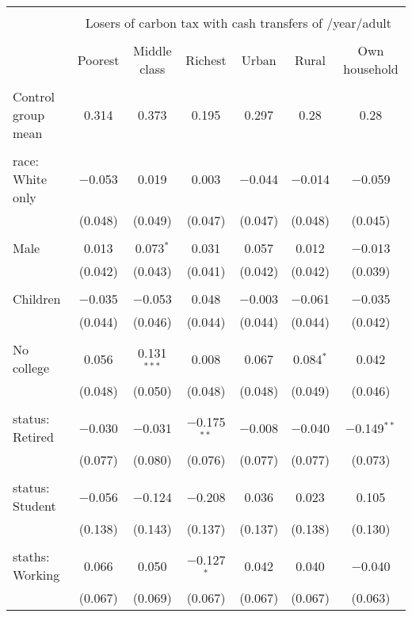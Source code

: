 
\begin{tabular}{@{\extracolsep{5pt}}lcccccc} 
\\[-1.8ex]\hline 
\hline \\[-1.8ex] 
 & \multicolumn{6}{c}{Losers of carbon tax with cash transfers of \textdollar 600/year/adult} \\ 
\cline{2-7} 
\\[-1.8ex] & Poorest & Middle class & Richest & Urban & Rural & Own household \\ 
\hline \\[-1.8ex] 
 Control group mean & 0.314 & 0.373 & 0.195 & 0.297 & 0.28 & 0.28  \\ \hline \\[-1.8ex] race: White only & $-$0.053 & 0.019 & 0.003 & $-$0.044 & $-$0.014 & $-$0.059 \\ 
  & (0.048) & (0.049) & (0.047) & (0.047) & (0.048) & (0.045) \\ 
  & & & & & & \\ 
 Male & 0.013 & 0.073$^{*}$ & 0.031 & 0.057 & 0.012 & $-$0.013 \\ 
  & (0.042) & (0.043) & (0.041) & (0.042) & (0.042) & (0.039) \\ 
  & & & & & & \\ 
 Children & $-$0.035 & $-$0.053 & 0.048 & $-$0.003 & $-$0.061 & $-$0.035 \\ 
  & (0.044) & (0.046) & (0.044) & (0.044) & (0.044) & (0.042) \\ 
  & & & & & & \\ 
 No college & 0.056 & 0.131$^{***}$ & 0.008 & 0.067 & 0.084$^{*}$ & 0.042 \\ 
  & (0.048) & (0.050) & (0.048) & (0.048) & (0.049) & (0.046) \\ 
  & & & & & & \\ 
 status: Retired & $-$0.030 & $-$0.031 & $-$0.175$^{**}$ & $-$0.008 & $-$0.040 & $-$0.149$^{**}$ \\ 
  & (0.077) & (0.080) & (0.076) & (0.077) & (0.077) & (0.073) \\ 
  & & & & & & \\ 
 status: Student & $-$0.056 & $-$0.124 & $-$0.208 & 0.036 & 0.023 & 0.105 \\ 
  & (0.138) & (0.143) & (0.137) & (0.137) & (0.138) & (0.130) \\ 
  & & & & & & \\ 
 staths: Working & 0.066 & 0.050 & $-$0.127$^{*}$ & 0.042 & 0.040 & $-$0.040 \\ 
  & (0.067) & (0.069) & (0.067) & (0.067) & (0.067) & (0.063) \\ 

\end{tabular}
